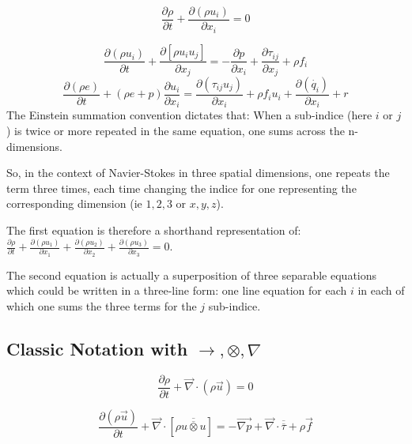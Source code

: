 \documentclass[]{article}
\begin{document}
\begin{equation}
	\frac{\partial \rho}{\partial t} + \frac{\partial(\rho u_{i})}{\partial x_{i}} = 0
\end{equation}

\begin{equation}
	\frac{\partial (\rho u_{i})}{\partial t} + \frac{\partial[\rho u_{i}u_{j}]}{\partial x_{j}} = -\frac{\partial p}{\partial x_{i}} + \frac{\partial \tau_{ij}}{\partial x_{j}} + \rho f_{i} \end{equation}
\begin{equation}
	\frac{\partial (\rho e)}{\partial t} + (\rho e+p)\frac{\partial u_{i}}{\partial x_{i}} = \frac{\partial(\tau_{ij}u_{j})}{\partial x_{i}} + \rho f_{i}u_{i} + \frac{\partial(\dot{ q_{i}})}{\partial x_{i}} + r \end{equation}
The Einstein summation convention dictates that: When a sub-indice (here $i$ or $j$) is twice or more repeated in the same equation, one sums across the n-dimensions. 

So, in the context of Navier-Stokes in three spatial dimensions,  one repeats the term three times, each time changing the indice for one representing the corresponding dimension (ie $1,2,3$ or $x,y,z$).

The first equation is therefore a shorthand representation of: $\frac{\partial \rho}{\partial t}+\frac{\partial(\rho u_{1})}{\partial x_{1}}+\frac{\partial(\rho u_{2})}{\partial x_{2}}+ \frac{\partial(\rho u_{3})}{\partial x_{3}}=0$.

The second equation is actually a superposition of three separable equations which could be written in a three-line form: one line equation for each $i$ in each of which one sums the three terms for the $j$ sub-indice.

\subsection{Classic Notation with $\longrightarrow , \otimes , \nabla$}

\begin{equation}
	\frac{\partial \rho}{\partial t} + \overrightarrow{\nabla}\cdot(\rho\overrightarrow{u})=0
\end{equation}


\begin{equation}
	\frac{\partial(\rho \overrightarrow{u})}{\partial t} + \overrightarrow{\nabla}\cdot[\rho\overline{\overline{u\otimes u}}] = -\overrightarrow{\nabla p} + \overrightarrow{\nabla}\cdot\overline{\overline{\tau}} + \rho\overrightarrow{f}
\end{equation}
\end{document}
